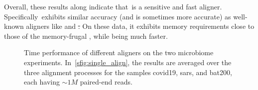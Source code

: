 Overall, these results along indicate that~\puffaligner is a
sensitive and fast aligner. Specifically~\puffaligner exhibits similar 
accuracy (and is sometimes more accurate) as well-known aligners like \bt and \st. 
On these data, it exhibits memory requirements close to those of the memory-frugal \bt, 
while being much faster.
\begin{figure}[H]
    \centering
    \hfill
    \caption[Time performance of different aligners on the microbiome
    experiments]{Time performance of different aligners on the two microbiome
    experiments. In~\ref{sfig:single_align}, the results are averaged
    over the three alignment processes for the samples covid19, sars, and
    bat200, each having $\sim1M$ paired-end reads.
}
\end{figure}
